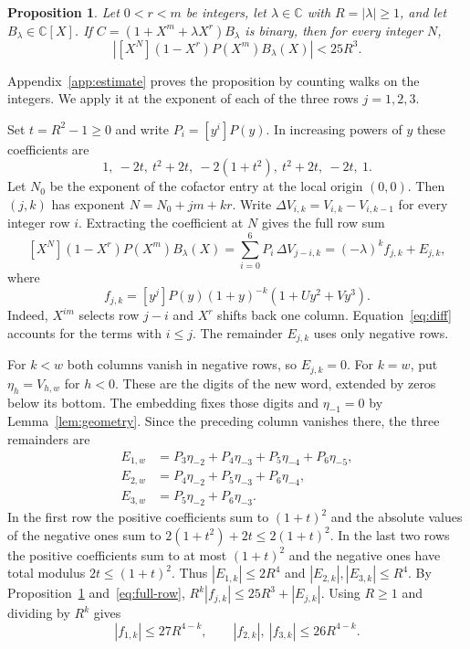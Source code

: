 \documentclass[11pt,reqno]{amsart}
\numberwithin{equation}{section}
\newtheorem{proposition}[theorem]{Proposition}
\begin{document}
\begin{proposition}\label{prop:norm}
Let $0<r<m$ be integers, let $\lambda\in\mathbb C$ with $R=|\lambda|\ge1$, and let $B_\lambda\in\mathbb C[X]$. If $C=(1+X^m+\lambda X^r)B_\lambda$ is binary, then for every integer $N$,
\[
 \left|[X^N](1-X^r)P(X^m)B_\lambda(X)\right|<25R^3.
\]
\end{proposition}
Appendix~\ref{app:estimate} proves the proposition by counting walks on the integers. We apply it at the exponent of each of the three rows $j=1,2,3$.

Set $t=R^2-1\ge0$ and write $P_i=[y^i]P(y)$. In increasing powers of $y$ these coefficients are
\[
 1,\ -2t,\ t^2+2t,\ -2(1+t^2),\ t^2+2t,\ -2t,\ 1 .
\]
Let $N_0$ be the exponent of the cofactor entry at the local origin $(0,0)$. Then $(j,k)$ has exponent $N=N_0+jm+kr$. Write $\Delta V_{i,k}=V_{i,k}-V_{i,k-1}$ for every integer row $i$. Extracting the coefficient at $N$ gives the full row sum
\begin{equation}\label{eq:full-row}
 [X^N](1-X^r)P(X^m)B_\lambda(X)
    =\sum_{i=0}^6 P_i\,\Delta V_{j-i,k}
    =(-\lambda)^k f_{j,k}+E_{j,k},
\end{equation}
where
\[
 f_{j,k}=[y^j]P(y)(1+y)^{-k}(1+Uy^2+Vy^3).
\]
Indeed, $X^{im}$ selects row $j-i$ and $X^r$ shifts back one column. Equation~\eqref{eq:diff} accounts for the terms with $i\le j$. The remainder $E_{j,k}$ uses only negative rows.

For $k<w$ both columns vanish in negative rows, so $E_{j,k}=0$. For $k=w$, put $\eta_h=V_{h,w}$ for $h<0$. These are the digits of the new word, extended by zeros below its bottom. The embedding fixes those digits and $\eta_{-1}=0$ by Lemma~\ref{lem:geometry}. Since the preceding column vanishes there, the three remainders are
\[
\begin{aligned}
 E_{1,w}&=P_3\eta_{-2}+P_4\eta_{-3}+P_5\eta_{-4}+P_6\eta_{-5},\\
 E_{2,w}&=P_4\eta_{-2}+P_5\eta_{-3}+P_6\eta_{-4},\\
 E_{3,w}&=P_5\eta_{-2}+P_6\eta_{-3}.
\end{aligned}
\]
In the first row the positive coefficients sum to $(1+t)^2$ and the absolute values of the negative ones sum to $2(1+t^2)+2t\le 2(1+t)^2$. In the last two rows the positive coefficients sum to at most $(1+t)^2$ and the negative ones have total modulus $2t\le(1+t)^2$. Thus $|E_{1,k}|\le 2R^4$ and $|E_{2,k}|,|E_{3,k}|\le R^4$. By Proposition~\ref{prop:norm} and~\eqref{eq:full-row},
$R^k|f_{j,k}|\le 25R^3+|E_{j,k}|$. Using $R\ge1$ and dividing by $R^k$ gives
\begin{equation}\label{eq:constraint}
 |f_{1,k}|\le27R^{4-k},\qquad |f_{2,k}|,\ |f_{3,k}|\le26R^{4-k}.
\end{equation}
\end{document}
